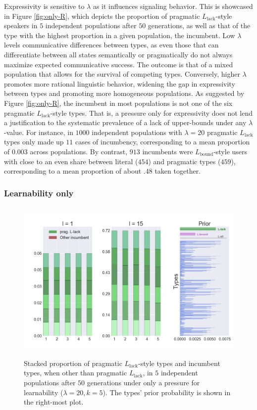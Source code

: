 \documentclass[a4paper, 11pt]{article}
\newcommand{\mylang}[1]{\ensuremath{L_{\text{#1}}}\xspace} %
\newcommand{\Lbound}{\mylang{bound}}
\newcommand{\Llack}{\mylang{lack}}
\begin{document}
Expressivity is sensitive to $\lambda$ as it influences signaling behavior. This is showcased in Figure \ref{fig:only-R}, which depicts the proportion of pragmatic $\Llack$-style speakers in $5$ independent populations after $50$ generations, as well as that of the type with the highest proportion in a given population, the incumbent. Low $\lambda$ levels communicative differences between types, as even those that can differentiate between all states semantically or pragmatically do not always maximize expected communicative success. The outcome is that of a mixed population that allows for the survival of competing types. Conversely, higher $\lambda$ promotes more rational linguistic behavior, widening the gap in expressivity between types and promoting more homogeneous populations. As suggested by Figure \ref{fig:only-R}, the incumbent in most populations is not one of the six pragmatic $\Llack$-style types. That is, a pressure only for expressivity does not lend a justification to the systematic prevalence of a lack of upper-bounds under any $\lambda$-value. For instance, in $1000$ independent populations with $\lambda = 20$ pragmatic $\Llack$ types only made up $11$ cases of incumbency, corresponding to a mean proportion of $0.003$ across populations. By contrast, $913$ incumbents were $\Lbound$-style users with close to an even share between literal ($454$) and pragmatic types ($459$), corresponding to a mean proportion of about $.48$ taken together. %


\subsubsection{Learnability only}

\begin{figure}
\centering
\includegraphics[width=1\textwidth,height=8cm,keepaspectratio]{./plots/fig2-onlym-pr}
\caption{Stacked proportion of pragmatic $\Llack$-style types and incumbent types, when other than pragmatic $\Llack$, in $5$ independent populations after $50$ generations under only a pressure for learnability ($\lambda = 20, k = 5$). The types' prior probability is shown in the right-most plot.}
\label{fig:only-M}
\end{figure}
\end{document}
